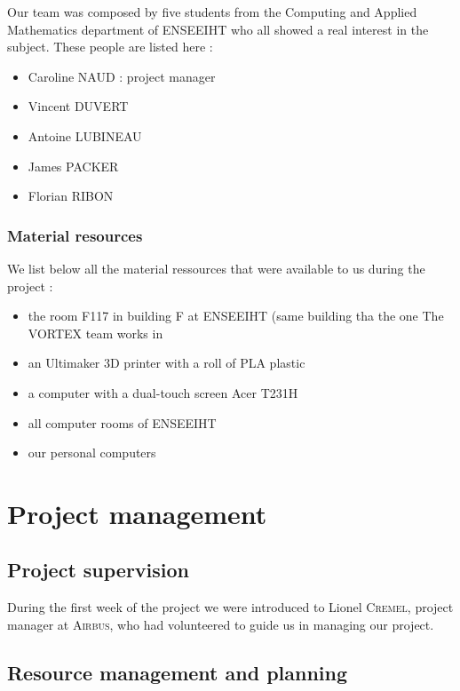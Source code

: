\documentclass{report}
\begin{document}
	Our team was composed by five students from the Computing and Applied Mathematics department of ENSEEIHT who all showed a real interest in the subject. These people are listed here :

\begin{itemize}
\item Caroline \textsc{NAUD} : project manager
\item Vincent \textsc{DUVERT}
\item Antoine \textsc{LUBINEAU}
\item James \textsc{PACKER}
\item Florian \textsc{RIBON}
\end{itemize}

\subsection{Material resources}

	We list below all the material ressources that were available to us during the project :

\begin{itemize}
\item the room F117 in building F at ENSEEIHT (same building tha the one The \textsc{VORTEX} team works in
\item an Ultimaker 3D printer with a roll of PLA plastic
\item a computer with a dual-touch screen Acer T231H
\item all computer rooms of ENSEEIHT
\item our personal computers
\end{itemize}

\chapter{Project management}

\section{Project supervision}

	During the first week of the project we were introduced to Lionel \textsc{Cremel}, project manager at \textsc{Airbus}, who had volunteered to guide us in managing our project.

\section{Resource management and planning}
\end{document}
